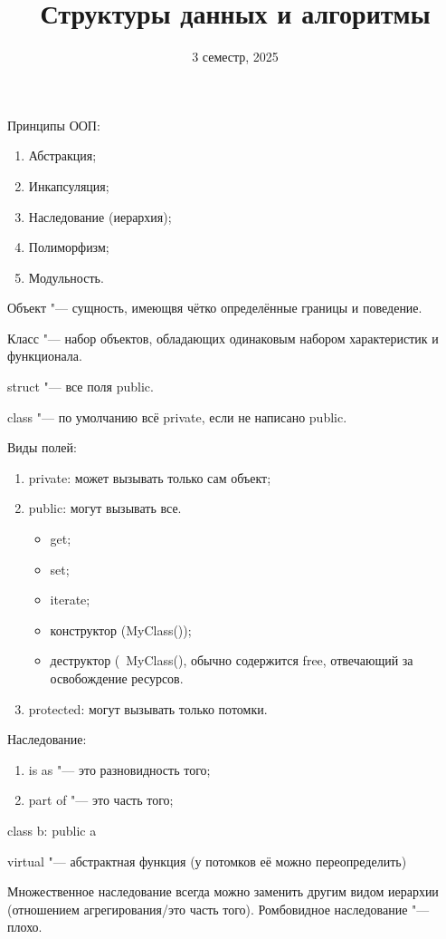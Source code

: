 \documentclass[12pt]{article}
\begin{document}
\author{}
\title{Структуры данных и алгоритмы}
\date{3 семестр, 2025}
\maketitle

Принципы ООП:
\begin{enumerate}
\item Абстракция;
\item Инкапсуляция;
\item Наследование (иерархия);
\item Полиморфизм;
\item Модульность.
\end{enumerate}

Объект "--- сущность, имеющвя чётко определённые границы и поведение.

Класс "---  набор объектов, обладающих одинаковым набором характеристик и функционала.

struct "--- все поля public.

class "--- по умолчанию всё private, если не написано public.

Виды полей:
\begin{enumerate}
\item private: может вызывать только сам объект;
\item public: могут вызывать все.
	\begin{itemize}
	\item get;
	\item set;
	\item iterate;
	\item конструктор (MyClass());
	\item деструктор (~MyClass(), обычно содержится free, отвечающий за освобождение ресурсов.
	\end{itemize}
\item  protected: могут вызывать только потомки.
\end{enumerate}

Наследование:
\begin{enumerate}
\item is as "--- это разновидность того;
\item part of "--- это часть того;
\end{enumerate}

class b: public a

virtual "--- абстрактная функция (у потомков её можно переопределить)

Множественное наследование всегда можно заменить другим видом иерархии (отношением агрегирования/это часть того). Ромбовидное наследование "--- плохо.
\end{document}
